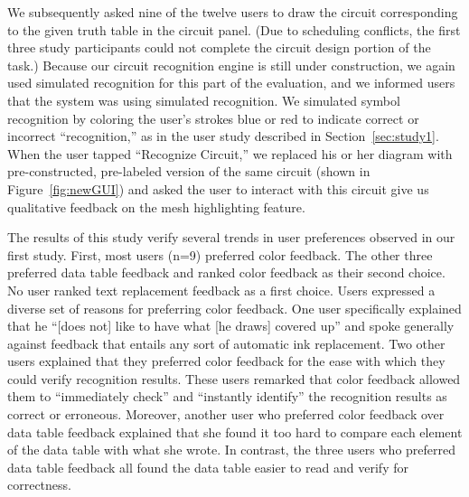 \documentclass{elsart}
\begin{document}
We subsequently asked nine of the twelve users to draw the circuit
corresponding to the given truth table in the circuit panel.  (Due to
scheduling conflicts, the first three study participants could not
complete the circuit design portion of the task.)  Because our circuit
recognition engine is still under construction, we again used
simulated recognition for this part of the evaluation, and we informed
users that the system was using simulated recognition.  We simulated
symbol recognition by coloring the user's strokes blue or red to
indicate correct or incorrect ``recognition,'' as in the user study
described in Section~\ref{sec:study1}.  When the user tapped
``Recognize Circuit,'' we replaced his or her diagram with
pre-constructed, pre-labeled version of the same circuit (shown in
Figure~\ref{fig:newGUI}) and asked the user to interact with this
circuit give us qualitative feedback on the mesh highlighting feature.

The results of this study verify several trends in user preferences
observed in our first study.  First, most users (n=9)
preferred color feedback.  The other three preferred data table
feedback and ranked color feedback as their second choice.  No user
ranked text replacement feedback as a first choice.  Users expressed
a diverse set of reasons for preferring color feedback.  One user
specifically explained that he ``[does not] like to have what [he
draws] covered up'' and spoke generally against feedback that entails
any sort of automatic ink replacement.  Two other users
explained that they preferred color feedback for the ease with which
they could verify recognition results.  These users remarked that color
feedback allowed them to ``immediately check'' and ``instantly identify''
the recognition results as correct or erroneous.  Moreover, another
user who preferred color feedback over data table feedback explained
that she found it too hard to compare each element of the data table
with what she wrote.  In contrast, the three users who preferred data
table feedback all found the data table easier to read and verify for
correctness.


\end{document}

